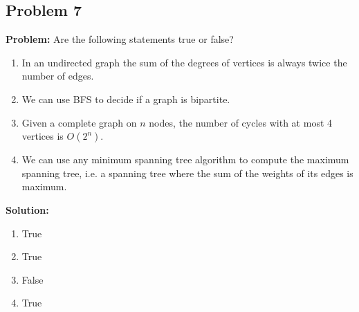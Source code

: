 \documentclass{article}
\begin{document}
\subsection*{Problem 7}
\noindent\textbf{Problem:} Are the following statements true or false?
\begin{enumerate}[label=\alph*)]
  \item  In an undirected graph the sum of the degrees of vertices is always twice the number of edges.
  \item We can use BFS to decide if a graph is bipartite.
  \item Given a complete graph on $n$ nodes, the number of cycles with at most 4 vertices is $O(2^n)$.
  \item We can use any minimum spanning tree algorithm to compute the maximum spanning tree, i.e. a spanning tree where the sum of the weights of its edges is maximum.
\end{enumerate}
\bigskip

\noindent\textbf{Solution:}
\begin{enumerate}[label=\alph*)]
  \item True
  \item True
  \item False
  \item True
\end{enumerate}
\end{document}
